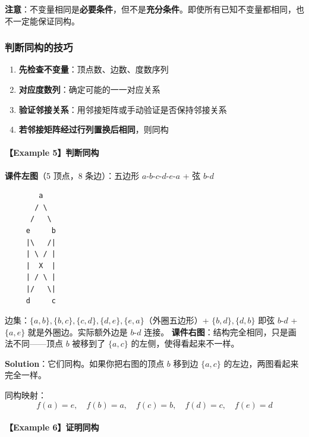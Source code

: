 \documentclass[10pt,a4paper,openany]{ctexbook}
\theoremstyle{definition}
\theoremstyle{remark}
\renewenvironment{quote}
  {\list{}{\leftmargin=1em\rightmargin=0pt\topsep=0.5pt\partopsep=0pt}\item[]}
  {\endlist}
\begin{document}
\begin{quote}
\textbf{注意}：不变量相同是\textbf{必要条件}，但不是\textbf{充分条件}。即使所有已知不变量都相同，也不一定能保证同构。

\end{quote}
\vspace{-2pt}

\subsubsection{判断同构的技巧}

\begin{enumerate}
\item \textbf{先检查不变量}：顶点数、边数、度数序列
\item \textbf{对应度数列}：确定可能的一一对应关系
\item \textbf{验证邻接关系}：用邻接矩阵或手动验证是否保持邻接关系
\item \textbf{若邻接矩阵经过行列置换后相同}，则同构

\end{enumerate}

\paragraph{【Example 5】判断同构}

\textbf{课件左图}（5 顶点，8 条边）：五边形 $a$-$b$-$c$-$d$-$e$-$a$ + 弦 $b$-$d$
{\footnotesize\begin{verbatim}
        a
       / \
      /   \
     e     b
     |\   /|
     | \ / |
     |  X  |
     | / \ |
     |/   \|
     d     c
\end{verbatim}}

边集：$\{a,b\}, \{b,c\}, \{c,d\}, \{d,e\}, \{e,a\}$（外圈五边形）+ $\{b,d\}, \{d,b\}$ 即弦 $b$-$d$ + $\{a,e\}$ 就是外圈边。实际额外边是 $b$-$d$ 连接。
\textbf{课件右图}：结构完全相同，只是画法不同——顶点 $b$ 被移到了 $\{a,c\}$ 的左侧，使得看起来不一样。
\begin{quote}
\textbf{Solution}：它们同构。如果你把右图的顶点 $b$ 移到边 $\{a,c\}$ 的左边，两图看起来完全一样。

同构映射：
\[
f(a) = e,\quad f(b) = a,\quad f(c) = b,\quad f(d) = c,\quad f(e) = d
\]


\end{quote}

\paragraph{【Example 6】证明同构}
\end{document}
